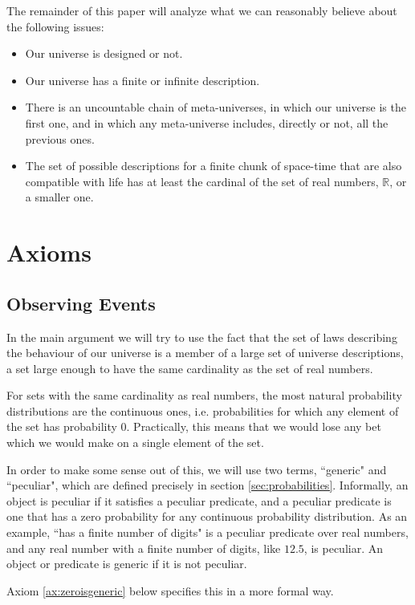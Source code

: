 \documentclass[a4paper
,draft
]{article}
\def\reale{\mathbb{R}}
\newcommand{\ghilimele}[1]{``#1"}
\begin{document}
The remainder of this paper will analyze what we can reasonably believe about
the following issues:
\begin{itemize}
  \item Our universe is designed or not.
  \item Our universe has a finite or infinite description.
  \item There is an uncountable chain of meta-universes, in which
        our universe is the first one, and in which any meta-universe
        includes, directly or not, all the previous ones.
  \item The set of possible descriptions for a finite chunk of space-time
        that are also compatible with life has at least the cardinal
        of the set of real numbers, $\reale$, or a smaller one.
\end{itemize}

\section{Axioms}
\label{sec:axioms}

\subsection{Observing Events}
In the main argument we will try to use the fact that the set of laws describing
the behaviour of our universe is a member of a large set of universe
descriptions, a set large enough to have the same cardinality as the set of
real numbers.

For sets with the same cardinality as real numbers,
the most natural probability distributions are the continuous
ones, i.e. probabilities for which any element of the set has probability $0$.
Practically, this means that we would lose any bet which we would make on a
single element of the set.

In order to make some sense out of this, we will use two terms,
\ghilimele{generic} and \ghilimele{peculiar},
which are defined precisely in section \ref{sec:probabilities}.
Informally,
an object is peculiar if it satisfies a peculiar predicate, and a peculiar
predicate is one that has a zero probability for any continuous probability
distribution.
As an example,
\ghilimele{has a finite number of digits} is a peculiar
predicate over real numbers, and any real number with a finite number
of digits, like $12.5$, is peculiar. An object or predicate is generic if
it is not peculiar.

Axiom \ref{ax:zeroisgeneric} below specifies this in a more formal way.
\end{document}
